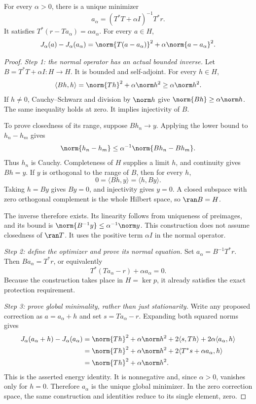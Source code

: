 \begin{theorem}\label{WR06}
For every $\alpha>0$, there is a unique minimizer
\[
 a_\alpha=(T^*T+\alpha I)^{-1}T^*r.
\]
It satisfies $T^*(r-Ta_\alpha)=\alpha a_\alpha$. For every $a\in H$,
\begin{equation}\label{eq:regularization-energy}
 J_\alpha(a)-J_\alpha(a_\alpha)
 =\norm{T(a-a_\alpha)}^2+\alpha\norm{a-a_\alpha}^2.
\end{equation}
\end{theorem}
\begin{proof}
\emph{Step 1: the normal operator has an actual bounded inverse.} Let $B=T^*T+\alpha I:H\to H$. It is bounded and self-adjoint. For every $h\in H$,
\[
 \langle Bh,h\rangle=\norm{Th}^2+\alpha\norm h^2
 \ge\alpha\norm h^2.
\]
If $h\ne0$, Cauchy--Schwarz and division by $\norm h$ give $\norm{Bh}\ge\alpha\norm h$. The same inequality holds at zero. It implies injectivity of $B$.

To prove closedness of its range, suppose $Bh_n\to y$. Applying the lower bound to $h_n-h_m$ gives
\[
 \norm{h_n-h_m}\le\alpha^{-1}\norm{Bh_n-Bh_m}.
\]
Thus $h_n$ is Cauchy. Completeness of $H$ supplies a limit $h$, and continuity gives $Bh=y$. If $y$ is orthogonal to the range of $B$, then for every $h$,
\[
 0=\langle Bh,y\rangle=\langle h,By\rangle.
\]
Taking $h=By$ gives $By=0$, and injectivity gives $y=0$. A closed subspace with zero orthogonal complement is the whole Hilbert space, so $\ran B=H$.

The inverse therefore exists. Its linearity follows from uniqueness of preimages, and its bound is $\norm{B^{-1}y}\le\alpha^{-1}\norm y$. This construction does not assume closedness of $\ran T$. It uses the positive term $\alpha I$ in the normal operator.

\emph{Step 2: define the optimizer and prove its normal equation.} Set $a_\alpha=B^{-1}T^*r$. Then $Ba_\alpha=T^*r$, or equivalently
\[
 T^*(Ta_\alpha-r)+\alpha a_\alpha=0.
\]
Because the construction takes place in $H=\ker p$, it already satisfies the exact protection requirement.

\emph{Step 3: prove global minimality, rather than just stationarity.} Write any proposed correction as $a=a_\alpha+h$ and set $s=Ta_\alpha-r$. Expanding both squared norms gives
\[
\begin{aligned}
 J_\alpha(a_\alpha+h)-J_\alpha(a_\alpha)
 &=\norm{Th}^2+\alpha\norm h^2
     +2\langle s,Th\rangle+2\alpha\langle a_\alpha,h\rangle\\
 &=\norm{Th}^2+\alpha\norm h^2
     +2\langle T^*s+\alpha a_\alpha,h\rangle\\
 &=\norm{Th}^2+\alpha\norm h^2.
\end{aligned}
\]
This is the asserted energy identity. It is nonnegative and, since $\alpha>0$, vanishes only for $h=0$. Therefore $a_\alpha$ is the unique global minimizer. In the zero correction space, the same construction and identities reduce to its single element, zero.
\end{proof}


